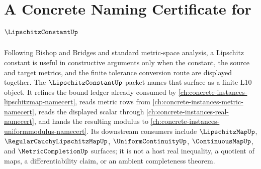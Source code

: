 \chapter{A Concrete Naming Certificate for $\LipschitzConstantUp$}
\label{ch:concrete-instances-lipschitz-constant-namecert}

Following Bishop and Bridges and standard metric-space analysis, a Lipschitz constant is useful in constructive arguments only when the constant, the source and target metrics, and the finite tolerance conversion route are displayed together. The $\LipschitzConstantUp$ packet names that surface as a finite L10 object. It refines the bound ledger already consumed by \autoref{ch:concrete-instances-lipschitzmap-namecert}, reads metric rows from \autoref{ch:concrete-instances-metric-namecert}, reads the displayed scalar through \autoref{ch:concrete-instances-real-namecert}, and hands the resulting modulus to \autoref{ch:concrete-instances-uniformmodulus-namecert}. Its downstream consumers include $\LipschitzMapUp$, $\RegularCauchyLipschitzMapUp$, $\UniformContinuityUp$, $\ContinuousMapUp$, and $\MetricCompletionUp$ surfaces; it is not a host real inequality, a quotient of maps, a differentiability claim, or an ambient completeness theorem.


